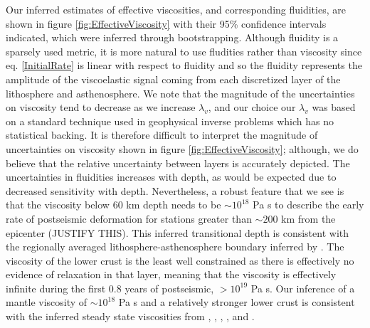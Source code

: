 \documentclass[12pt]{article}
\begin{document}
Our inferred estimates of effective viscosities, and corresponding fluidities, are shown in figure \ref{fig:EffectiveViscosity} with their 95\% confidence intervals indicated, which were inferred through bootstrapping. Although fluidity is a sparsely used metric, it is more natural to use fludities rather than viscosity since eq. \ref{InitialRate} is linear with respect to fluidity and so the fluidity represents the amplitude of the viscoelastic signal coming from each discretized layer of the lithosphere and asthenosphere.  We note that the magnitude of the uncertainties on viscosity tend to decrease as we increase $\lambda_v$, and our choice our $\lambda_v$ was based on a standard technique used in geophysical inverse problems which has no statistical backing.  It is therefore difficult to interpret the magnitude of uncertainties on viscosity shown in figure \ref{fig:EffectiveViscosity}; although, we do believe that the relative uncertainty between layers is accurately depicted.  The uncertainties in fluidities increases with depth, as would be expected due to decreased sensitivity with depth.  Nevertheless, a robust feature that we see is that the viscosity below 60 km depth needs to be $\sim 10^{18}$ Pa s to describe the early rate of postseismic deformation for stations greater than $\sim200$ km from the epicenter (JUSTIFY THIS).  This inferred transitional depth is consistent with the regionally averaged lithosphere-asthenosphere boundary inferred by \cite{Lekic2011}. The viscosity of the lower crust is the least well constrained as there is effectively no evidence of relaxation in that layer, meaning that the viscosity is effectively infinite during the first 0.8 years of postseismic, $>10^{19}$ Pa s. Our inference of a mantle viscosity of $\sim 10^{18}$ Pa s and a relatively stronger lower crust is consistent with the inferred steady state viscosities from \cite{Pollitz2000}, \cite{Pollitz2003}, \cite{Johnson2007}, \cite{Spinler2015}, and \cite{Rollins2015}.  
\end{document}
